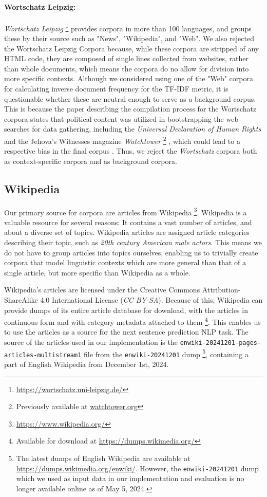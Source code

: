 \paragraph{Wortschatz Leipzig:}
\textit{Wortschatz Leipzig} \footnote{\url{https://wortschatz.uni-leipzig.de/}} provides corpora in more than 100 languages, and groups these by their source such as "News", "Wikipedia", and "Web".
We also rejected the Wortschatz Leipzig Corpora because, while these corpora are stripped of any HTML code, they are composed of single lines collected from websites, rather than whole documents, which means the corpora do no allow for division into more specific contexts.
Although we considered using one of the "Web" corpora for calculating inverse document frequency for the TF-IDF metric, it is questionable whether these are neutral enough to serve as a background corpus.
This is because the paper describing the compilation process for the Wortschatz corpora states that political content was utilized in bootstrapping the web searches for data gathering, including the \textit{Universal Declaration of Human Rights} and the Jehova's Witnesses magazine \textit{Watchtower} \footnote{Previously available at \url{watchtower.org}} \cite{goldhahnBuildingLargeMonolingual2012}, which could lead to a respective bias in the final corpus .
Thus, we reject the \textit{Wortschatz} corpora both as context-specific corpora and as background corpora.

\subsection{Wikipedia} \label{sec:wikipedia}
Our primary source for corpora are articles from Wikipedia \footnote{\url{https://www.wikipedia.org/}}.
Wikipedia is a valuable resource for several reasons:
It contains a vast number of articles, and about a diverse set of topics.
Wikipedia articles are assigned article categories describing their topic, such as \textit{20th century American male actors}.
This means we do not have to group articles into topics ourselves, enabling us to trivially create corpora that model linguistic contexts which are more general than that of a single article, but more specific than Wikipedia as a whole.

Wikipedia's articles are licensed under the Creative Commons Attribution-ShareAlike 4.0 International License (\textit{CC BY-SA}).
Because of this, Wikipedia can provide dumps of its entire article database for download, with the articles in continuous form and with category metadata attached to them \footnote{Available for download at \url{https://dumps.wikimedia.org/}}.
This enables us to use the articles as a source for the next sentence prediction NLP task.
The source of the articles used in our implementation is the \texttt{enwiki-20241201-pages-articles-multistream1} file from the \texttt{enwiki-20241201} dump \footnote{The latest dumps of English Wikipedia are available at \url{https://dumps.wikimedia.org/enwiki/}. However, the \texttt{enwiki-20241201} dump which we used as input data in our implementation and evaluation is no longer available online as of May 5, 2024.}, containing a part of English Wikipedia from December 1st, 2024.

